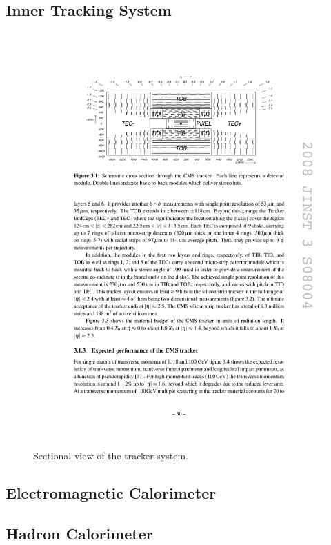 \subsection{Inner Tracking System}

\begin{figure}[htbp]
  \begin{center}
    \leavevmode
    \includegraphics[width=\columnwidth]{tracker}
    \caption{Sectional view of the tracker system.}
    \label{Tracker}
  \end{center}
\end{figure}

\subsection{Electromagnetic Calorimeter}

\subsection{Hadron Calorimeter}


